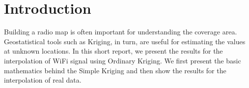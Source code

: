 \section{Introduction}
\label{section:introduction}

Building a radio map is often important for understanding 
the coverage area. Geostatistical tools such as Kriging, 
in turn, are useful for estimating the values at unknown 
locations. In this short report, we present the results 
for the interpolation of WiFi signal using Ordinary Kriging. 
We first present the basic mathematics behind the Simple 
Kriging and then show the results for the 
interpolation of real data.
